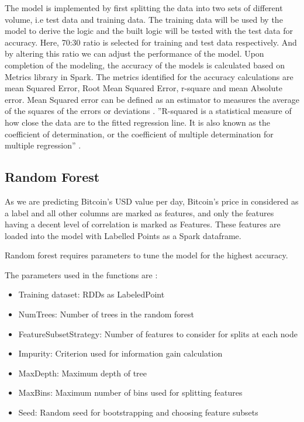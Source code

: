 \documentclass[sigconf]{acmart}
\begin{document}
The model is implemented by first splitting the data into two sets of different volume, i.e test data and training data. The training data will be used by the model to derive the logic and the built logic will be tested with the test data for accuracy. Here, 70:30 ratio is selected for training and test data respectively. And by altering this ratio we can adjust the performance of the model. Upon completion of the modeling, the accuracy of the models is calculated based on Metrics library in Spark. The metrics identified for the accuracy calculations are mean Squared Error, Root Mean Squared Error, r-square and mean Absolute error. Mean Squared error can be defined as an estimator to measures the average of the squares of the errors or deviations \cite{MSE}. ''R-squared is a statistical measure of how close the data are to the fitted regression line. It is also known as the coefficient of determination, or the coefficient of multiple determination for multiple regression'' \cite{rsq:online}.



\subsection{Random Forest}
As we are predicting Bitcoin's USD value per day, Bitcoin's price in considered as a label and all other columns are marked as features, and only the features having a decent level of correlation is marked as Features. These features are loaded into the model with Labelled Points as a Spark dataframe.

Random forest requires parameters to tune the model for the highest accuracy. 

The parameters used in the functions are \cite{api:docs} :
\begin{itemize}
\item Training dataset: RDDs as LabeledPoint
\item NumTrees: Number of trees in the random forest
\item FeatureSubsetStrategy: Number of features to consider for splits at each node
\item Impurity: Criterion used for information gain calculation 
\item MaxDepth: Maximum depth of tree
\item MaxBins: Maximum number of bins used for splitting features
\item Seed: Random seed for bootstrapping and choosing feature subsets
\end{itemize}
\end{document}
